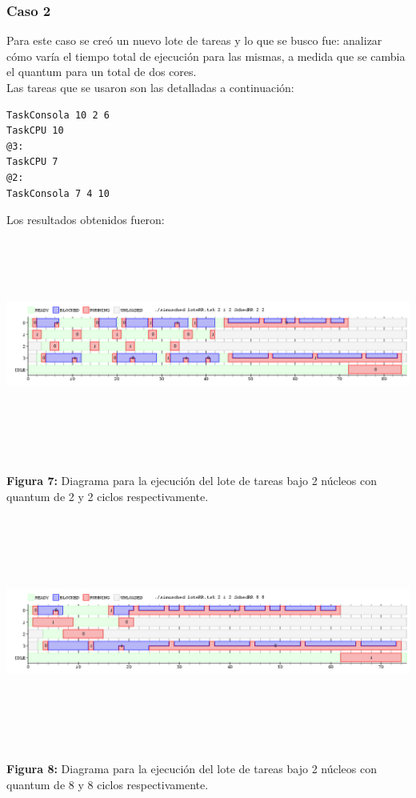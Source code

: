 \documentclass[a4paper]{article}
\begin{document}
 \newpage
 \subsubsection*{Caso 2}\label{caso2}
 
 Para este caso se cre\'o un nuevo lote de tareas y lo que se busco fue: analizar c\'omo varía el tiempo total de ejecución para las mismas, a medida que se cambia el quantum para un total de dos cores.\\
 
 Las tareas que se usaron son las detalladas a continuaci\'on:\\
 \begin{codesnippet}
	\begin{verbatim}
TaskConsola 10 2 6
TaskCPU 10
@3:
TaskCPU 7
@2:
TaskConsola 7 4 10
	\end{verbatim}
	\end{codesnippet}


Los resultados obtenidos fueron:\\

 \includegraphics[width=\textwidth,height=3.0in,keepaspectratio]{imagenes/ej4/eje1.png} \\
\begin {flushleft}
\textbf{Figura 7:} Diagrama para la ejecuci\'on del lote de tareas bajo 2 n\'ucleos con quantum de 2 y 2 ciclos respectivamente.
\end{flushleft}

 \includegraphics[width=\textwidth,height=3.0in,keepaspectratio]{imagenes/ej4/eje2.png} \\
\begin {flushleft}
\textbf{Figura 8:} Diagrama para la ejecuci\'on del lote de tareas bajo 2 n\'ucleos con quantum de 8 y 8 ciclos respectivamente.
\end{flushleft}
\end{document}
